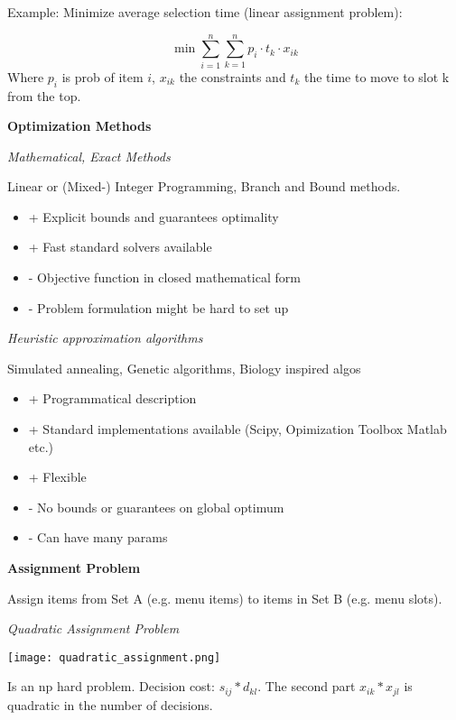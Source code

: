 Example: Minimize average selection time (linear assignment problem):

$$\min \sum_{i=1}^{n} \sum_{k=1}^{n} p_{i} \cdot t_{k} \cdot x_{ik}$$
Where $p_i$ is prob of item $i$, $x_{ik}$ the constraints and $t_k$ the time to move to slot k from the top. \medskip

\textbf{Optimization Methods}

\textit{Mathematical, Exact Methods} \smallskip

Linear or (Mixed-) Integer Programming, Branch and Bound methods.

\begin{itemize}[itemsep=-5pt, topsep=0pt, leftmargin=*]
	\item + Explicit bounds and guarantees optimality
	\item + Fast standard solvers available
	\item - Objective function in closed mathematical form
	\item - Problem formulation might be hard to set up
\end{itemize}


\textit{Heuristic approximation algorithms} \smallskip

Simulated annealing, Genetic algorithms, Biology inspired algos

\begin{itemize}[itemsep=-5pt, topsep=0pt, leftmargin=*]
	\item + Programmatical description
	\item + Standard implementations available (Scipy, Opimization Toolbox Matlab etc.)
	\item + Flexible
	\item - No bounds or guarantees on global optimum
	\item - Can have many params
\end{itemize}


\textbf{Assignment Problem} \medskip

Assign items from Set A (e.g. menu items) to items in Set B (e.g. menu slots). \medskip

\textit{Quadratic Assignment Problem}

\begin{center}
	\texttt{[image: quadratic\_assignment.png]}
\end{center}

Is an np hard problem. Decision cost: $s_{ij} * d_{kl}$. The second part  $x_{ik} * x_{jl}$ is quadratic in the number of decisions. \medskip


